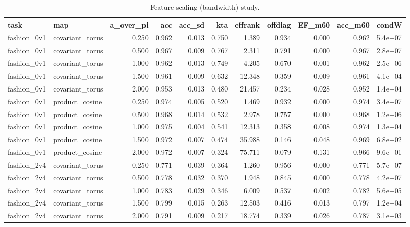 \begin{table}
\caption{Feature-scaling (bandwidth) study.}
\label{tab:table_bandwidth}
\begin{tabular}{llrrrrrrrrl}
\toprule
task & map & a\_over\_pi & acc & acc\_sd & kta & effrank & offdiag & EF\_m60 & acc\_m60 & condW \\
\midrule
fashion\_0v1 & covariant\_torus & 0.250 & 0.962 & 0.013 & 0.750 & 1.389 & 0.934 & 0.000 & 0.962 & 5.4e+07 \\
fashion\_0v1 & covariant\_torus & 0.500 & 0.967 & 0.009 & 0.767 & 2.311 & 0.791 & 0.000 & 0.967 & 2.8e+07 \\
fashion\_0v1 & covariant\_torus & 1.000 & 0.962 & 0.013 & 0.749 & 4.205 & 0.670 & 0.001 & 0.962 & 2.5e+06 \\
fashion\_0v1 & covariant\_torus & 1.500 & 0.961 & 0.009 & 0.632 & 12.348 & 0.359 & 0.009 & 0.961 & 4.1e+04 \\
fashion\_0v1 & covariant\_torus & 2.000 & 0.953 & 0.013 & 0.480 & 21.457 & 0.234 & 0.028 & 0.952 & 1.4e+04 \\
fashion\_0v1 & product\_cosine & 0.250 & 0.974 & 0.005 & 0.520 & 1.469 & 0.932 & 0.000 & 0.974 & 3.4e+07 \\
fashion\_0v1 & product\_cosine & 0.500 & 0.968 & 0.014 & 0.532 & 2.978 & 0.757 & 0.000 & 0.968 & 1.2e+06 \\
fashion\_0v1 & product\_cosine & 1.000 & 0.975 & 0.004 & 0.541 & 12.313 & 0.358 & 0.008 & 0.974 & 1.3e+04 \\
fashion\_0v1 & product\_cosine & 1.500 & 0.972 & 0.007 & 0.474 & 35.988 & 0.146 & 0.048 & 0.969 & 6.8e+02 \\
fashion\_0v1 & product\_cosine & 2.000 & 0.972 & 0.007 & 0.324 & 75.711 & 0.079 & 0.131 & 0.966 & 9.6e+01 \\
fashion\_2v4 & covariant\_torus & 0.250 & 0.771 & 0.039 & 0.364 & 1.260 & 0.956 & 0.000 & 0.771 & 5.7e+07 \\
fashion\_2v4 & covariant\_torus & 0.500 & 0.778 & 0.032 & 0.370 & 1.948 & 0.845 & 0.000 & 0.778 & 4.2e+07 \\
fashion\_2v4 & covariant\_torus & 1.000 & 0.783 & 0.029 & 0.346 & 6.009 & 0.537 & 0.002 & 0.782 & 5.6e+05 \\
fashion\_2v4 & covariant\_torus & 1.500 & 0.799 & 0.015 & 0.263 & 12.503 & 0.416 & 0.013 & 0.797 & 1.2e+04 \\
fashion\_2v4 & covariant\_torus & 2.000 & 0.791 & 0.009 & 0.217 & 18.774 & 0.339 & 0.026 & 0.787 & 3.1e+03 \\

\end{tabular}
\end{table}

